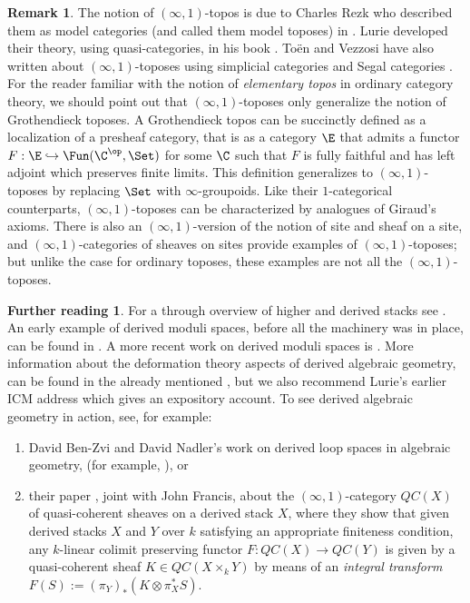 \documentclass[12pt]{amsart}
\theoremstyle{definition} \newtheorem{definition}[theorem]{Definition}
\newtheorem{remark}[theorem]{Remark}
\newtheorem*{further}{Further reading}
\numberwithin{equation}{section}
\newcommand{\oo}{\infty}
\newcommand{\io}{$(\oo,1)$}
\begin{document}
\begin{remark}
  The notion of \io-topos is due to Charles Rezk who described them as
  model categories (and called them model toposes) in
  \cite{RezkTopos}.  Lurie developed their theory, using
  quasi-categories, in his book \cite{HTT}. To\"{e}n and Vezzosi have
  also written about \io-toposes using simplicial categories
  \cite{HAG1} and Segal categories \cite{SegalTopos}. For the reader
  familiar with the notion of \emph{elementary topos} in ordinary
  category theory, we should point out that \io-toposes only
  generalize the notion of Grothendieck toposes.  A Grothendieck topos
  can be succinctly defined as a localization of a presheaf category,
  that is as a category $\E$ that admits a functor $F : \E
  \hookrightarrow \Fun(\C^{\op},\Set)$ for some $\C$ such that $F$ is
  fully faithful and has left adjoint which preserves finite limits.
  This definition generalizes to \io-toposes by replacing $\Set$ with
  $\oo$-groupoids.  Like their $1$-categorical counterparts,
  \io-toposes can be characterized by analogues of Giraud's axioms.
  There is also an \io-version of the notion of site and sheaf on a
  site, and \io-categories of sheaves on sites provide examples of
  \io-toposes; but unlike the case for ordinary toposes, these
  examples are not all the \io-toposes.
\end{remark}

\begin{further}
  For a through overview of higher and derived stacks see
  \cite{ToenHD}. An early example of derived moduli spaces, before all
  the machinery was in place, can be found in \cite{Kontsevich}. A
  more recent work on derived moduli spaces is \cite{HAGDAG}.
  More information about the deformation theory
  aspects of derived algebraic geometry, can be found in the
  already mentioned \cite{DAG10}, but we also recommend Lurie's
  earlier ICM address \cite{LurieICM}
  which gives an expository account. To see derived algebraic
  geometry in action, see, for example:
  \begin{enumerate}
    \item David Ben-Zvi and David Nadler's work on derived loop spaces
      in algebraic geometry, (for example, \cite{BN}), or
    \item their paper \cite{BFN}, joint with John Francis,
      about the \io-category $QC(X)$
      of quasi-coherent sheaves on a derived stack $X$, where they
      show that given derived stacks $X$ and $Y$ over $k$ satisfying
      an appropriate finiteness condition, any $k$-linear
      colimit preserving functor $F : QC(X) \to QC(Y)$ is given by a
      quasi-coherent sheaf $K \in QC(X \times_k Y)$ by means of an
      \emph{integral transform} $F(S) := (\pi_Y)_* (K \otimes \pi_X^*
      S)$.
  \end{enumerate}
\end{further}
\end{document}
